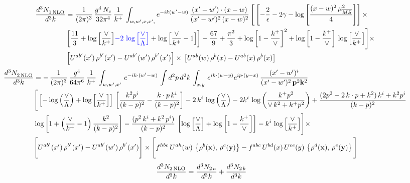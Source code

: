 \documentclass[9pt]{article}
\numberwithin{equation}{section}
\begin{document}
\begin{align}
     \frac{d^{3}N_{1\,\rm NLO}^{\rm}}{d^{3}k} &  = \frac{1}{(2\pi)^{3}}\, \frac{g^{4}\,N_{c}}{32\pi^{4}}\,\frac{1}{k^{+}}\, \int_{w, w',x,x',} e^{-ik(w^\prime-w)}\, \frac{(x'-w')\cdot (x-w)}{(x'-w')^{2}\, (x-w)^{2}}\, \Bigg[\left[-\frac{2}{\epsilon}-2\gamma-\log{\left[\frac{(x-w)^{2}\,\mu^{2}_{\overline{MS}}}{4}\right]}\right]\times \notag \\ & \left[\frac{11}{3}+\log{\left[\frac{\vee}{k^{+}}\right]}{\color{blue}-2\,\log{\left[\frac{\vee}{\Lambda}\right]}}+\log{\left[\frac{\vee}{k^{+}}-1\right]}\right]-\frac{67}{9}+\frac{\pi^{2}}{3}+\log{\left[1-\frac{k^{+}}{\vee}\right]^{2}}+\log{\left[1-\frac{k^{+}}{\vee}\right]}\,\log{\left[\frac{\vee}{k^{+}}\right]}\Bigg]\times\notag \\ & \left[U^{ab'}(x')\,\rho^{b'}(x') - U^{ab'}(w')\,\rho^{b'}(x')\right]\times\,\left[U^{ab}(w)\,\rho^{b}(x) - U^{ab}(x)\,\rho^{b}(x)\right]
\end{align}
\begin{align}
   \frac{d^{3}N_{2\,\rm NLO}^{\rm}}{d^{3}k} &  = -\,\frac{1}{(2\pi)^{3}}\,\frac{g^{4}}{64\pi^{6}}\, \frac{1}{k^{+}}\,\int_{w,w',x'}\, e^{-ik\cdot (w'-w)}\,\int d^{2}p\,d^{2}k\,\int_{x,y}\, e^{ik\cdot (w-y)} e^{ip\cdot (y-x)}\, \frac{(x'-w')^{i}}{(x'-w')^{2}\,\mathbf{p}^{2}\mathbf{k}^{2} }\notag \\ & \Bigg[\left[-\log{\left(\frac{\vee}{\Lambda}\right)}+\log{\left[\frac{\vee}{k^{+}}\right]}\right]\,\left[\frac{k^{2}p^{i}}{(k-p)^{2}}-\frac{k\cdot p\,k^{i}}{(k-p)^{2}}\right]-2\,k^{i}\,\log{\left(\frac{\vee}{\Lambda}\right)} -2k^{i}\,\log{\left(\frac{k^{+}p^{2}}{\vee\, k^{2}+k^{+}p^{2}}\right)}+\frac{(2p^{2}-2\,k\cdot p + k^{2})\,k^{i} + k^{2}p^{i}}{(k-p)^{2}}\notag \\ &  \log{\left[1+\left(\frac{\vee}{k^{+}}-1\right)\frac{k^{2}}{(k-p)^{2}}\right]} - \frac{(p^{2}\,k^{i}+k^{2}\,p^{i})}{(k-p)^{2}}\,\left[\log{\left[\frac{\vee}{\Lambda}\right]}+\log{\left[1-\frac{k^{+}}{\vee}\right]}\right]-k^{i}\,\log{\left[\frac{\vee}{k^{+}}\right]}\Bigg]\times\,\notag \\ &  \Bigg[U^{ab'}(x')\,\rho^{b'}(x') - U^{ab'}(w')\,\rho^{b'}(x')\Bigg]\times\Bigg[f^{hbc}\,U^{ah}(w)\,\left\{ \rho^{b}(\mathbf{x}),\,\rho^{c}(\mathbf{y})\right\}-f^{abc}\,U^{bd}(x)\, U^{ce}(y)\, \left\{\rho^{d}(\mathbf{x}),\,\rho^{e}(\mathbf{y})\right\}\Bigg]
\end{align}
\begin{align}
\frac{d^{3}N_{2\,\rm NLO}}{d^{3}k} &= \frac{d^{3}N_{2\,a}}{d^{3}k} + \frac{d^{3}N_{2\,b}}{d^{3}k}
\end{align}
\end{document}
